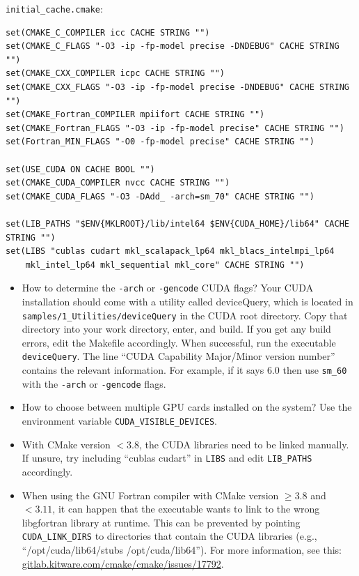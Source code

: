 \texttt{initial\_cache.cmake}:
\begin{verbatim}
set(CMAKE_C_COMPILER icc CACHE STRING "")
set(CMAKE_C_FLAGS "-O3 -ip -fp-model precise -DNDEBUG" CACHE STRING "")
set(CMAKE_CXX_COMPILER icpc CACHE STRING "")
set(CMAKE_CXX_FLAGS "-O3 -ip -fp-model precise -DNDEBUG" CACHE STRING "")
set(CMAKE_Fortran_COMPILER mpiifort CACHE STRING "")
set(CMAKE_Fortran_FLAGS "-O3 -ip -fp-model precise" CACHE STRING "")
set(Fortran_MIN_FLAGS "-O0 -fp-model precise" CACHE STRING "")

set(USE_CUDA ON CACHE BOOL "")
set(CMAKE_CUDA_COMPILER nvcc CACHE STRING "")
set(CMAKE_CUDA_FLAGS "-O3 -DAdd_ -arch=sm_70" CACHE STRING "")

set(LIB_PATHS "$ENV{MKLROOT}/lib/intel64 $ENV{CUDA_HOME}/lib64" CACHE STRING "")
set(LIBS "cublas cudart mkl_scalapack_lp64 mkl_blacs_intelmpi_lp64
    mkl_intel_lp64 mkl_sequential mkl_core" CACHE STRING "")
\end{verbatim}

\begin{itemize}
\item How to determine the \texttt{-arch} or \texttt{-gencode} CUDA flags? Your CUDA installation should come with a utility called deviceQuery, which is located in \\
\texttt{samples/1\_Utilities/deviceQuery} in the CUDA root directory. Copy that directory into your work directory, enter, and build. If you get any build errors, edit the Makefile accordingly. When successful, run the executable \texttt{deviceQuery}. The line ``CUDA Capability Major/Minor version number'' contains the relevant information. For example, if it says 6.0 then use \texttt{sm\_60} with the \texttt{-arch} or \texttt{-gencode} flags.
\item How to choose between multiple GPU cards installed on the system? Use the environment variable \texttt{CUDA\_VISIBLE\_DEVICES}.
\item With CMake version $<3.8$, the CUDA libraries need to be linked manually. If unsure, try including ``cublas cudart'' in \texttt{LIBS} and edit \texttt{LIB\_PATHS} accordingly.
\item When using the GNU Fortran compiler with CMake version $\ge3.8$ and $<3.11$, it can happen that the executable wants to link to the wrong libgfortran library at runtime. This can be prevented by pointing \texttt{CUDA\_LINK\_DIRS} to directories that contain the CUDA libraries (e.g., ``/opt/cuda/lib64/stubs /opt/cuda/lib64''). For more information, see this: \url{gitlab.kitware.com/cmake/cmake/issues/17792}.
\end{itemize}

